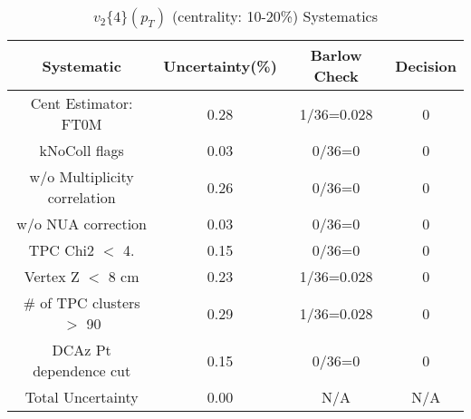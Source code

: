 \begin{table}[htbp]
\caption{$v_2\{4\}(p_{T})$ (centrality: 10-20\%) Systematics}
\label{tab:Sys_pTDiffv24ChFull}
\centering
\begin{tabular}{|c|c|c|c|}
\hline
Systematic & Uncertainty(\%) & Barlow Check & Decision \\
\hline
Cent Estimator: FT0M & 0.28 & 1/36=0.028 & 0 \\
kNoColl flags & 0.03 & 0/36=0 & 0 \\
w/o Multiplicity correlation & 0.26 & 0/36=0 & 0 \\
w/o NUA correction & 0.03 & 0/36=0 & 0 \\
TPC Chi2 $<$ 4. & 0.15 & 0/36=0 & 0 \\
Vertex Z $<$ 8 cm & 0.23 & 1/36=0.028 & 0 \\
\# of TPC clusters $>$ 90 & 0.29 & 1/36=0.028 & 0 \\
DCAz Pt dependence cut & 0.15 & 0/36=0 & 0 \\
\hline
Total Uncertainty & 0.00 & N/A & N/A \\
\hline
\end{tabular}
\end{table}
